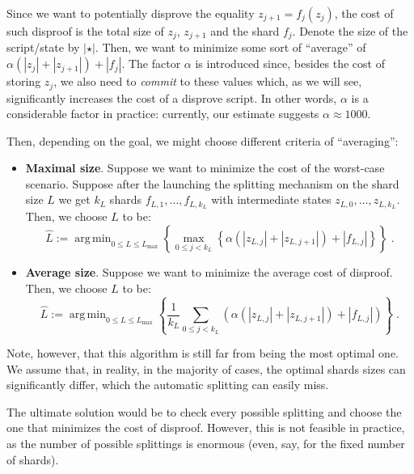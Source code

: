 \documentclass{iacrtrans}
\DeclareMathOperator*{\argmin}{arg\,min}
\begin{document}
Since we want to potentially disprove the equality $z_{j+1} = f_j(z_j)$, the
cost of such disproof is the total size of $z_j$, $z_{j+1}$ and the shard $f_j$.
Denote the size of the script/state by $|\star|$. Then, we want to minimize some
sort of ``average'' of $\alpha(|z_j| + |z_{j+1}|) + |f_j|$. The factor $\alpha$
is introduced since, besides the cost of storing $z_j$, we also need to
\textit{commit} to these values which, as we will see, significantly increases
the cost of a disprove script. In other words, $\alpha$ is a considerable factor
in practice: currently, our estimate suggests $\alpha \approx 1000$.

Then, depending on the goal, we might choose different criteria of
``averaging'':
\begin{itemize}
  \item \textbf{Maximal size}. Suppose we want to minimize the cost of the
  worst-case scenario. Suppose after the launching the splitting mechanism on
  the shard size $L$ we get $k_L$ shards $f_{L,1},\dots,f_{L,k_L}$ with
  intermediate states $z_{L,0},\dots,z_{L,k_L}$. Then, we choose $L$ to be:
  \begin{equation*}
    \hat{L} := \argmin_{0 \leq L \leq L_{\max}} \left\{ \max_{ 0 \leq j < k_L } \left\{ \alpha(|z_{L,j}| + |z_{L,j+1}|) + |f_{L,j}| \right\} \right\}\;.
  \end{equation*}
  \item \textbf{Average size}. Suppose we want to minimize the average cost of
  disproof. Then, we choose $L$ to be:
  \begin{equation*}
    \hat{L} := \argmin_{0 \leq L \leq L_{\max}} \left\{ \frac{1}{k_L} \sum_{0 \leq j < k_L} \left( \alpha(|z_{L,j}| + |z_{L,j+1}|) + |f_{L,j}| \right) \right\}\;.
  \end{equation*}
\end{itemize}

Note, however, that this algorithm is still far from being the most optimal one.
We assume that, in reality, in the majority of cases, the optimal shards sizes
can significantly differ, which the automatic splitting can easily miss.

The ultimate solution would be to check every possible splitting and choose the
one that minimizes the cost of disproof. However, this is not feasible in
practice, as the number of possible splittings is enormous (even, say, for the
fixed number of shards).
\end{document}
